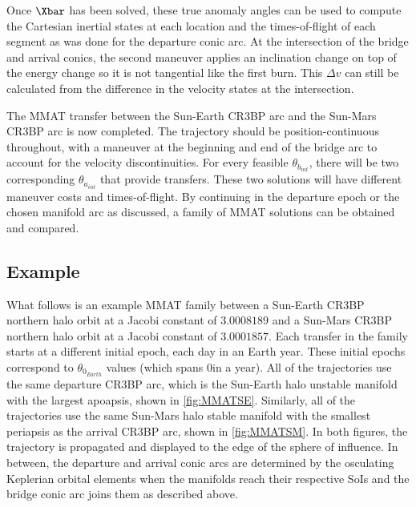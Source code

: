 Once $\Xbar$ has been solved, these true anomaly angles can be used to compute the Cartesian
inertial states at each location and the times-of-flight of each segment as was done for the
departure conic arc. At the intersection of the bridge and arrival conics, the second maneuver
applies an inclination change on top of the energy change so it is not tangential like the first
burn. This $\Delta v$ can still be calculated from the difference in the velocity states at the
intersection.

The MMAT transfer between the Sun-Earth CR3BP arc and the Sun-Mars CR3BP arc is now completed. The
trajectory should be position-continuous throughout, with a maneuver at the beginning and end of
the bridge arc to account for the velocity discontinuities. For every feasible $\theta_{b_{int}}$,
there will be two corresponding $\theta_{a_{int}}$ that provide transfers. These two solutions will
have different maneuver costs and times-of-flight. By continuing in the departure epoch or the
chosen manifold arc as discussed, a family of MMAT solutions can be obtained and compared.

\subsection{Example}
What follows is an example MMAT family between a Sun-Earth CR3BP northern halo orbit at a Jacobi
constant of $3.0008189$ and a Sun-Mars CR3BP northern halo orbit at a Jacobi constant of
$3.0001857$. Each transfer in the family starts at a different initial epoch, each day in an Earth
year. These initial epochs correspond to $\theta_{0_{Earth}}$ values (which spans
0\textdegree in a year). All of the trajectories use the same departure CR3BP arc,
which is the Sun-Earth halo unstable manifold with the largest apoapsis, shown in
\cref{fig:MMATSE}. Similarly, all of the trajectories use the same Sun-Mars halo stable manifold
with the smallest periapsis as the arrival CR3BP arc, shown in \cref{fig:MMATSM}. In both figures,
the trajectory is propagated and displayed to the edge of the sphere of influence. In between, the
departure and arrival conic arcs are determined by the osculating Keplerian orbital elements when
the manifolds reach their respective SoIs and the bridge conic arc joins them as described above.

